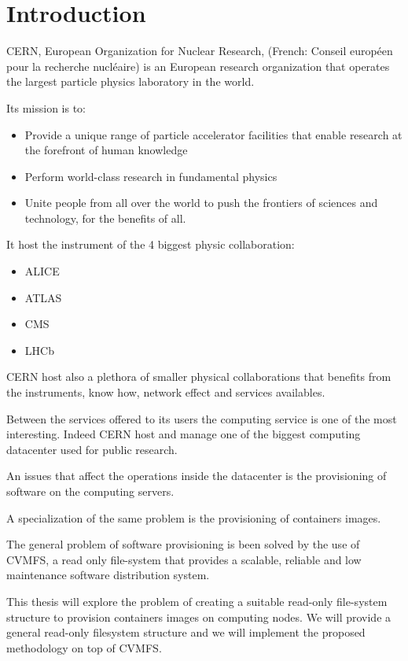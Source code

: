 \chapter{Introduction}\label{ch:introduction}

CERN, European Organization for Nuclear Research, (French: Conseil européen
pour la recherche nucléaire) is an European research organization that operates
the largest particle physics laboratory in the world.

Its mission is to: 
\begin{itemize}
	\item Provide a unique range of particle accelerator facilities that enable research at the forefront of human knowledge
	\item Perform world-class research in fundamental physics
	\item Unite people from all over the world to push the frontiers of sciences and technology, for the benefits of all.
\end{itemize}

It host the instrument of the 4 biggest physic collaboration: 
\begin{itemize}
\item ALICE
\item ATLAS
\item CMS
\item LHCb
\end{itemize}

CERN host also a plethora of smaller physical collaborations that benefits from
the instruments, know how, network effect and services availables.

Between the services offered to its users the computing service is one of the
most interesting. Indeed CERN host and manage one of the biggest computing
datacenter used for public research.

An issues that affect the operations inside the datacenter is the provisioning
of software on the computing servers.

A specialization of the same problem is the provisioning of containers images.

The general problem of software provisioning is been solved by the use of
CVMFS, a read only file-system that provides a scalable, reliable and low
maintenance software distribution system.

This thesis will explore the problem of creating a suitable read-only
file-system structure to provision containers images on computing nodes. We
will provide a general read-only filesystem structure and we will implement the
proposed methodology on top of CVMFS.


